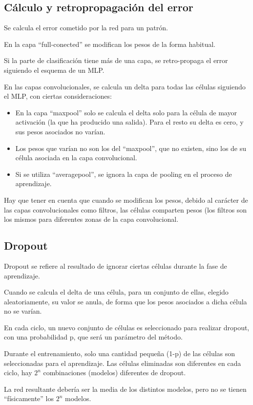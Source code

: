 \documentclass[12pt, twoside, openright]{report} %
\begin{document}
\subsection{Cálculo y retropropagación del error}
Se calcula el error cometido por la red para un patrón.

En la capa “full-conected” se modifican los pesos de la forma habitual.

Si la parte de clasificación tiene más de una capa, se retro-propaga el error siguiendo el esquema de un MLP.

En las capas convolucionales, se calcula un delta para todas las células siguiendo el MLP, con ciertas consideraciones:
\begin{itemize}
	\item En la capa “maxpool” solo se calcula el delta solo para la célula de mayor activación (la que ha producido una salida). Para el resto su delta es cero, y sus pesos asociados no varían.
	\item Los pesos que varían no son los del “maxpool”, que no existen, sino los de su célula asociada en la capa convolucional.
	\item Si se utiliza “averagepool”, se ignora la capa de pooling en el proceso de aprendizaje.
\end{itemize}
Hay que tener en cuenta que cuando se modifican los pesos, debido al carácter de las capas convolucionales como filtros, las células comparten pesos (los filtros son los mismos para diferentes zonas de la capa convolucional.

\subsection{Dropout}
Dropout se refiere al resultado de ignorar ciertas células durante la fase de aprendizaje.

Cuando se calcula el delta de una célula, para un conjunto de ellas, elegido aleatoriamente, su valor se anula, de forma que los pesos asociados a dicha célula no se varían.

En cada ciclo, un nuevo conjunto de células es seleccionado para realizar dropout, con una probabilidad p, que será un parámetro del método.

Durante el entrenamiento, solo una cantidad pequeña (1-p) de las células son seleccionadas para el aprendizaje. Las células eliminadas son diferentes en cada ciclo, hay $2^n$ combinaciones (modelos) diferentes de dropout.

La red resultante debería ser la media de los distintos modelos, pero no se tienen “físicamente” los $2^n$ modelos.
\end{document}
